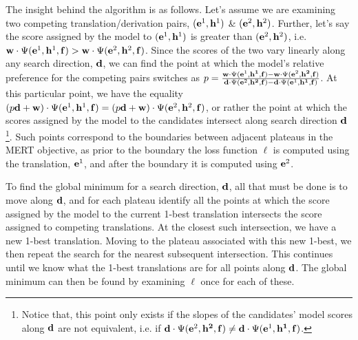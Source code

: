 \documentclass[11pt]{article}
\begin{document}
The insight behind the algorithm is as follows. Let's assume we are examining two competing translation/derivation pairs, \mbox{$({\bf e}^1, {\bf h}^1)$} \& \mbox{$({\bf e}^2, {\bf h}^2)$}. Further, let's say the score assigned by the model to \mbox{$({\bf e}^1, {\bf h}^1)$} is greater than  \mbox{$({\bf e}^2, {\bf h}^2)$}, i.e. \mbox{\mbox{${\bf w} \cdot \Psi({\bf e}^1, {\bf h}^1, {\bf f}) > {\bf w} \cdot \Psi({\bf e}^2, {\bf h}^2, {\bf f})$}}. Since the scores of the two vary linearly along any search direction, \mbox{${\bf d}$}, we can find the point at which the model's relative preference for the competing pairs switches as \mbox{$p = \frac{{\bf w} \cdot \Psi({\bf e}^1, {\bf h^1}, {\bf f}) - {\bf w} \cdot \Psi({\bf e}^2, {\bf h^2}, {\bf f})}{{\bf d} \cdot \Psi({\bf e}^2, {\bf h^2}, {\bf f}) - {\bf d} \cdot \Psi({\bf e}^1, {\bf h^1}, {\bf f})}$}. At this particular point, we have the equality \mbox{$(p{\bf d} + {\bf w}) \cdot \Psi({\bf e}^1, {\bf h}^1, {\bf f}) = (p{\bf d} + {\bf w}) \cdot \Psi({\bf e}^2, {\bf h}^2, {\bf f})$}, or rather the point at which the scores assigned by the model to the candidates intersect along search direction \mbox{${\bf d}$}\footnote{Notice that, this point only exists if the slopes of the candidates' model scores along \mbox{${\bf d}$} are not equivalent, i.e. if \mbox{${\bf d} \cdot \Psi({\bf e}^2, {\bf h^2}, {\bf f}) \neq {\bf d} \cdot \Psi({\bf e}^1, {\bf h^1}, {\bf f})$}.}. Such points correspond to the boundaries between adjacent plateaus in the MERT objective, as prior to the boundary the loss function \mbox{$\ell$} is computed using the translation, \mbox{${\bf e}^1$}, and after the boundary it is computed using \mbox{${\bf e}^2$}. 

To find the global minimum for a search direction, \mbox{${\bf d}$}, all that must be done is to move along \mbox{${\bf d}$}, and for each plateau identify all the points at which the score assigned by the model to the current 1-best translation intersects the score assigned to competing translations. At the closest such intersection, we have a new 1-best translation. Moving to the plateau associated with this new 1-best, we then repeat the search for the nearest subsequent intersection. This continues until we know what the 1-best translations are for all points along \mbox{${\bf d}$}. The global minimum can then be found by examining \mbox{$\ell$} once for each of these.
\end{document}
